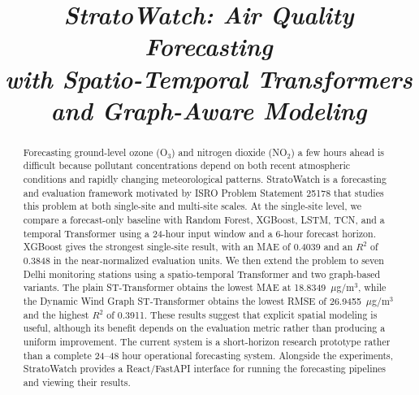 \documentclass[conference]{IEEEtran}
\begin{document}

\title{
\textbf{\textit{StratoWatch: Air Quality Forecasting}}\\[3pt]
\textbf{\textit{with Spatio-Temporal Transformers and Graph-Aware Modeling}}
}

\author{
}

\maketitle


\begin{abstract}
Forecasting ground-level ozone (O$_3$) and nitrogen dioxide (NO$_2$) a few hours ahead is
difficult because pollutant concentrations depend on both recent atmospheric conditions and
rapidly changing meteorological patterns. StratoWatch is a forecasting and evaluation
framework motivated by ISRO Problem Statement 25178 that studies this problem at both
single-site and multi-site scales. At the single-site level, we compare a forecast-only
baseline with Random Forest, XGBoost, LSTM, TCN, and a temporal Transformer using a 24-hour
input window and a 6-hour forecast horizon. XGBoost gives the strongest single-site result,
with an MAE of 0.4039 and an $R^2$ of 0.3848 in the near-normalized evaluation units. We then
extend the problem to seven Delhi monitoring stations using a spatio-temporal Transformer
and two graph-based variants. The plain ST-Transformer obtains the lowest MAE at
18.8349~$\mu$g/m$^3$, while the Dynamic Wind Graph ST-Transformer obtains the lowest RMSE
of 26.9455~$\mu$g/m$^3$ and the highest $R^2$ of 0.3911. These results suggest that explicit
spatial modeling is useful, although its benefit depends on the evaluation metric rather than
producing a uniform improvement. The current system is a short-horizon research prototype
rather than a complete 24--48 hour operational forecasting system. Alongside the experiments,
StratoWatch provides a React/FastAPI interface for running the forecasting pipelines and
viewing their results.
\end{abstract}
\end{document}
